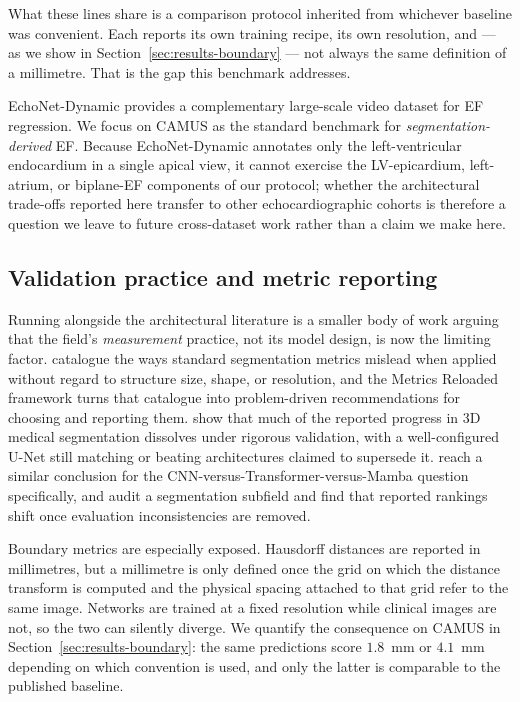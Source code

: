 What these lines share is a comparison protocol inherited from whichever
baseline was convenient. Each reports its own training recipe, its own
resolution, and — as we show in Section~\ref{sec:results-boundary} — not
always the same definition of a millimetre. That is the gap this benchmark
addresses.

EchoNet-Dynamic \citep{ouyang2020} provides a complementary large-scale
video dataset for EF regression. We focus on CAMUS as the standard
benchmark for \emph{segmentation-derived} EF. Because EchoNet-Dynamic
annotates only the left-ventricular endocardium in a single apical view,
it cannot exercise the LV-epicardium, left-atrium, or biplane-EF
components of our protocol; whether the architectural trade-offs reported
here transfer to other echocardiographic cohorts is therefore a question
we leave to future cross-dataset work rather than a claim we make here.

\subsection{Validation practice and metric reporting}
\label{sec:related-validation}

Running alongside the architectural literature is a smaller body of work
arguing that the field's \emph{measurement} practice, not its model
design, is now the limiting factor. \citet{reinke2021limitations} catalogue
the ways standard segmentation metrics mislead when applied without regard
to structure size, shape, or resolution, and the Metrics Reloaded
framework \citep{maierhein2024metrics} turns that catalogue into
problem-driven recommendations for choosing and reporting them.
\citet{isensee2024revisited} show that much of the reported progress in 3D
medical segmentation dissolves under rigorous validation, with a
well-configured U-Net still matching or beating architectures claimed to
supersede it. \citet{kazaj2025claims} reach a similar conclusion for the
CNN-versus-Transformer-versus-Mamba question specifically, and
\citet{urooj2026mirage} audit a segmentation subfield and find that
reported rankings shift once evaluation inconsistencies are removed.

Boundary metrics are especially exposed. Hausdorff distances are reported
in millimetres, but a millimetre is only defined once the grid on which
the distance transform is computed and the physical spacing attached to
that grid refer to the same image. Networks are trained at a fixed
resolution while clinical images are not, so the two can silently diverge.
We quantify the consequence on CAMUS in
Section~\ref{sec:results-boundary}: the same predictions score
$1.8$~mm or $4.1$~mm depending on which convention is used, and only the
latter is comparable to the published baseline.

